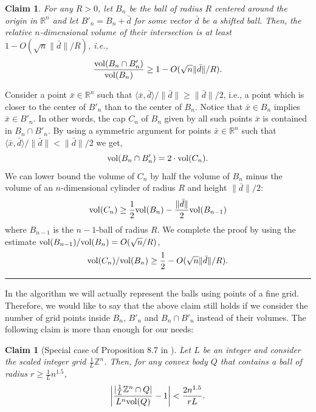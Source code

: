 \documentclass[11pt]{article}
\newtheorem{claim}[theorem]{Claim}
\newcommand{\qedsymb}{\hfill{\rule{2mm}{2mm}}}
\newenvironment{proof}{\begin{trivlist}
\item[\hspace{\labelsep}{\sl\noindent Proof:\/}]
}{\qedsymb\end{trivlist}}
\def\Z{\mathbb{Z}}
\def\R{\mathbb{R}}
\def\vol{{\rm vol}}
\begin{document}
\begin{claim}\label{ball_intersection}
For any $R>0$, let $B_n$ be the ball of radius $R$ centered around the origin in $\R^n$ and let $B'_n=B_n+\bar{d}$ for
some vector $\bar{d}$ be a shifted ball. Then, the relative $n$-dimensional volume of their intersection is at least
$1-O(\sqrt{n} \| \bar{d} \|/R)$, i.e.,
$$ \frac{\vol(B_n \cap B'_n)}{\vol(B_n)} \ge 1-O(\sqrt{n} \| \bar{d} \| / R).$$
\end{claim}
\begin{proof}
Consider a point $\bar{x} \in \R^n$ such that $\langle \bar{x},\bar{d} \rangle / \|\bar{d}\| \ge \|\bar{d}\|/2$, i.e.,
a point which is closer to the center of $B'_n$ than to the center of $B_n$. Notice that $\bar{x} \in B_n$ implies
$\bar{x} \in B'_n$. In other words, the cap $C_n$ of $B_n$ given by all such points $\bar{x}$ is contained in $B_n \cap
B'_n$. By using a symmetric argument for points $\bar{x} \in \R^n$ such that $\langle \bar{x},\bar{d} \rangle /
\|\bar{d}\| < \|\bar{d}\|/2$ we get,
$$ \vol(B_n \cap B'_n) = 2\cdot \vol(C_n).$$
We can lower bound the volume of $C_n$ by half the volume of $B_n$ minus the volume of an $n$-dimensional cylinder of
radius $R$ and height $\|\bar{d}\|/2$:
$$ \vol(C_n) \ge \frac{1}{2} \vol(B_n) - \frac{\|\bar{d}\|}{2} \vol(B_{n-1})$$
where $B_{n-1}$ is the $n-1$-ball of radius $R$. We complete the proof by using the estimate $\vol(B_{n-1})/\vol(B_n) =
O(\sqrt{n}/R)$,
$$ \vol(C_n)/\vol(B_n) \ge \frac{1}{2} - O(\sqrt{n}\|\bar{d}\|/R ).$$
\end{proof}

In the algorithm we will actually represent the balls using points of a fine grid. Therefore, we would like to say that
the above claim still holds if we consider the number of grid points inside $B_n$, $B'_n$ and $B_n \cap B'_n$ instead
of their volumes. The following claim is more than enough for our needs:

\begin{claim}[Special case of Proposition 8.7 in \cite{MicciancioBook}]\label{lattice_points_volume}
Let $L$ be an integer and consider the scaled integer grid $\frac{1}{L}\Z^n$. Then, for any convex body $Q$ that
contains a ball of radius $r \ge \frac{1}{L}n^{1.5}$,
 $$ \left| \frac{|\frac{1}{L}\Z^n \cap Q|}{L^n \vol(Q)} - 1\right| < \frac{2n^{1.5}}{rL}.$$
\end{claim}
\end{document}
